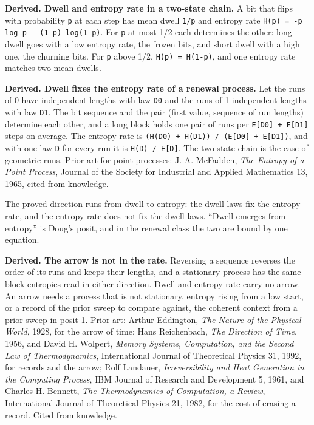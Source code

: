 \textbf{Derived. Dwell and entropy rate in a two-state chain.} A bit that flips with probability \texttt{p} at each step has mean dwell \texttt{1/\allowbreak{}p} and entropy rate \texttt{H(p) = -\allowbreak{}p log p -\allowbreak{} (1-\allowbreak{}p) log(1-\allowbreak{}p)}. For \texttt{p} at most 1/2 each determines the other: long dwell goes with a low entropy rate, the frozen bits, and short dwell with a high one, the churning bits. For \texttt{p} above 1/2, \texttt{H(p) = H(1-\allowbreak{}p)}, and one entropy rate matches two mean dwells.

\textbf{Derived. Dwell fixes the entropy rate of a renewal process.} Let the runs of 0 have independent lengths with law \texttt{D0} and the runs of 1 independent lengths with law \texttt{D1}. The bit sequence and the pair (first value, sequence of run lengths) determine each other, and a long block holds one pair of runs per \texttt{E[D0] + E[D1]} steps on average. The entropy rate is \texttt{(H(D0) + H(D1)) /\allowbreak{} (E[D0] + E[D1])}, and with one law \texttt{D} for every run it is \texttt{H(D) /\allowbreak{} E[D]}. The two-state chain is the case of geometric runs. Prior art for point processes: J. A. McFadden, \emph{The Entropy of a Point Process}, Journal of the Society for Industrial and Applied Mathematics 13, 1965, cited from knowledge.

The proved direction runs from dwell to entropy: the dwell laws fix the entropy rate, and the entropy rate does not fix the dwell laws. “Dwell emerges from entropy” is Doug's posit, and in the renewal class the two are bound by one equation.

\textbf{Derived. The arrow is not in the rate.} Reversing a sequence reverses the order of its runs and keeps their lengths, and a stationary process has the same block entropies read in either direction. Dwell and entropy rate carry no arrow. An arrow needs a process that is not stationary, entropy rising from a low start, or a record of the prior sweep to compare against, the coherent context from a prior sweep in posit 1. Prior art: Arthur Eddington, \emph{The Nature of the Physical World}, 1928, for the arrow of time; Hans Reichenbach, \emph{The Direction of Time}, 1956, and David H. Wolpert, \emph{Memory Systems, Computation, and the Second Law of Thermodynamics}, International Journal of Theoretical Physics 31, 1992, for records and the arrow; Rolf Landauer, \emph{Irreversibility and Heat Generation in the Computing Process}, IBM Journal of Research and Development 5, 1961, and Charles H. Bennett, \emph{The Thermodynamics of Computation, a Review}, International Journal of Theoretical Physics 21, 1982, for the cost of erasing a record. Cited from knowledge.

